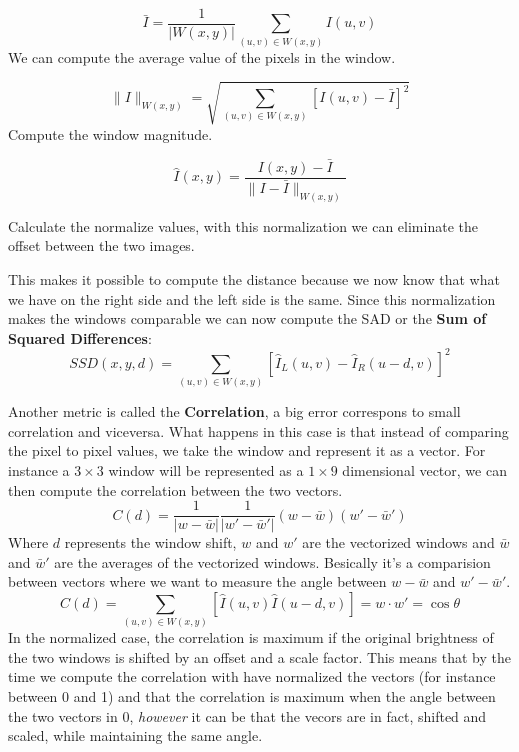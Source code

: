 \begin{multicols}{2}
\[
\bar{I} = \frac{1}{|W(x,y)|} \sum_{(u,v) \in W(x,y)} I(u,v)
\]
We can compute the average value of the pixels in the window.

\end{multicols}

\begin{multicols}{2}
\[
\| I \|_{W(x,y)} = \sqrt{\sum_{(u,v) \in W(x,y)} [I(u,v) - \bar{I}]^2}
\]
Compute the window magnitude.
\end{multicols}

\begin{multicols}{2}
\[
\hat{I}(x,y) = \frac{I(x,y) - \bar{I}}{\| I - \bar{I} \|_{W(x,y)}}
\]

Calculate the normalize values, with this normalization we can eliminate the offset between the two images.
\end{multicols}

This makes it possible to compute the distance because we now know that what we have on the right side and the left side is the same. Since this normalization makes the windows comparable we can now compute the SAD or the \textbf{Sum of Squared Differences}:
\[
SSD(x,y,d) = \sum_{(u,v) \in W(x,y)} [\hat{I}_L(u,v) - \hat{I}_R(u-d,v)]^2
\]

Another metric is called the \textbf{Correlation}, a big error correspons to small correlation and viceversa. What happens in this case is that instead of comparing the pixel to pixel values, we take the window and represent it as a vector. For instance a \(3\times 3\) window will be represented as a \(1\times9\) dimensional vector, we can then compute the correlation between the two vectors.
\[
C(d) = \frac{1}{|w-\bar{w}|}\frac{1}{|w'- \bar{w}'|}(w-\bar{w})(w'-\bar{w}')
\]
Where \(d\) represents the window shift, \(w\) and \(w'\) are the vectorized windows and \(\bar{w}\) and \(\bar{w}'\) are the averages of the vectorized windows. Besically it's a comparision between vectors where we want to measure the angle between \(w - \bar{w}\) and \(w' - \bar{w}'\).
\[
C(d) = \sum_{(u,v) \in W(x,y)} [\hat{I}(u,v) \hat{I}(u-d,v)] = w\cdot w' = \cos\theta    
\]
In the normalized case, the correlation is maximum if the original brightness of the two windows is shifted by an offset and a scale factor. This means that by the time we compute the correlation with have normalized the vectors (for instance between 0 and 1) and that the correlation is maximum when the angle between the two vectors in 0, \textit{however} it can be that the vecors are in fact, shifted and scaled, while maintaining the same angle. 

